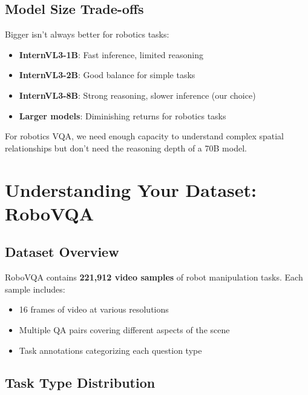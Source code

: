 \documentclass[11pt,a4paper]{article}
\begin{document}
\subsection{Model Size Trade-offs}

Bigger isn't always better for robotics tasks:

\begin{itemize}
    \item \textbf{InternVL3-1B}: Fast inference, limited reasoning
    \item \textbf{InternVL3-2B}: Good balance for simple tasks
    \item \textbf{InternVL3-8B}: Strong reasoning, slower inference (our choice)
    \item \textbf{Larger models}: Diminishing returns for robotics tasks
\end{itemize}

For robotics VQA, we need enough capacity to understand complex spatial relationships but don't need the reasoning depth of a 70B model.

\section{Understanding Your Dataset: RoboVQA}

\subsection{Dataset Overview}

RoboVQA contains \textbf{221,912 video samples} of robot manipulation tasks. Each sample includes:
\begin{itemize}
    \item 16 frames of video at various resolutions
    \item Multiple QA pairs covering different aspects of the scene
    \item Task annotations categorizing each question type
\end{itemize}

\subsection{Task Type Distribution}
\end{document}
